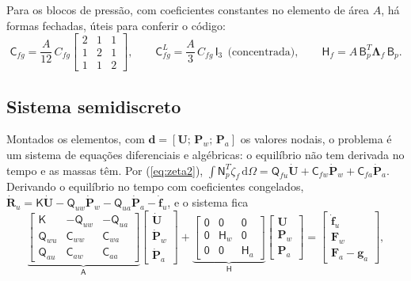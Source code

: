 \documentclass[11pt,a4paper]{article}
\newcommand{\mt}[1]{\mathsf{#1}}
\newcommand{\dd}{\mathrm d}
\begin{document}
Para os blocos de pressão, com coeficientes constantes no elemento de área $A$, há formas
fechadas, úteis para conferir o código:
\begin{equation}
\mt C_{fg}=\frac{A}{12}\,C_{fg}\begin{bmatrix}2&1&1\\1&2&1\\1&1&2\end{bmatrix},\qquad
\mt C^{L}_{fg}=\frac{A}{3}\,C_{fg}\,\mt I_3\ \ \text{(concentrada)},\qquad
\mt H_f=A\,\mt B_p^T\bm\Lambda_f\,\mt B_p .
\label{eq:T3fechadas}
\end{equation}

\subsection{Sistema semidiscreto}
Montados os elementos, com $\mathbf d=[\mathbf U;\,\mathbf P_w;\,\mathbf P_a]$ os valores
nodais, o problema é um sistema de equações diferenciais e algébricas: o equilíbrio não tem
derivada no tempo e as massas têm. Por (\ref{eq:zeta2}),
$\int\mt N_p^T\dot\zeta_f\,\dd\Omega=\mt Q_{fu}\dot{\mathbf U}+\mt C_{fw}\dot{\mathbf P}_w
+\mt C_{fa}\dot{\mathbf P}_a$. Derivando o equilíbrio no tempo com coeficientes congelados,
$\dot{\mathbf R}_u=\mt K\dot{\mathbf U}-\mt Q_{uw}\dot{\mathbf P}_w-\mt Q_{ua}\dot{\mathbf P}_a
-\dot{\mathbf f}_u$, e o sistema fica
\begin{equation}
\underbrace{\begin{bmatrix}\mt K&-\mt Q_{uw}&-\mt Q_{ua}\\\mt Q_{wu}&\mt C_{ww}&\mt C_{wa}\\
\mt Q_{au}&\mt C_{aw}&\mt C_{aa}\end{bmatrix}}_{\mt A}
\begin{bmatrix}\dot{\mathbf U}\\\dot{\mathbf P}_w\\\dot{\mathbf P}_a\end{bmatrix}
+\underbrace{\begin{bmatrix}\mt 0&\mt 0&\mt 0\\\mt 0&\mt H_w&\mt 0\\\mt 0&\mt 0&\mt H_a\end{bmatrix}}_{\mt H}
\begin{bmatrix}\mathbf U\\\mathbf P_w\\\mathbf P_a\end{bmatrix}
=\begin{bmatrix}\dot{\mathbf f}_u\\\mathbf F_w\\\mathbf F_a-\mathbf g_a\end{bmatrix},
\label{eq:semidiscreto}
\end{equation}
\end{document}
